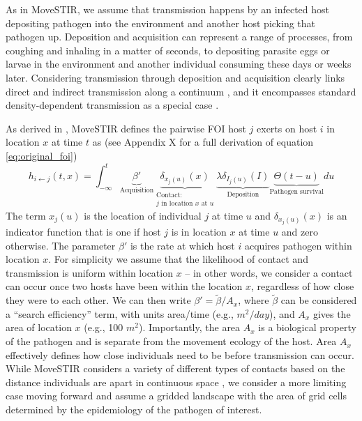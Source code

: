 ﻿\documentclass[11pt]{article}
\begin{document}
As in MoveSTIR, we assume that transmission happens by an infected host depositing pathogen into the environment and another host picking that pathogen up. 
Deposition and acquisition can represent a range of processes, from coughing and inhaling in a matter of seconds, to depositing parasite eggs or larvae in the environment and another individual consuming these days or weeks later. 
Considering transmission through deposition and acquisition clearly links direct and indirect transmission along a continuum \citep{Wilber2022}, and it encompasses standard density-dependent transmission as a special case \citep{Cortez2021}. 

As derived in \cite{Wilber2022}, MoveSTIR defines the pairwise FOI host $j$ exerts on host $i$ in location $x$ at time $t$ as \citep{Wilber2022} (see Appendix X for a full derivation of equation \ref{eq:original_foi})
\begin{equation}
    h_{i \leftarrow j}(t, x) = \int_{-\infty}^{t} \underbrace{\beta'}_{\text{Acquisition}} \underbrace{\delta_{x_j(u)}(x)}_{\substack{\text{Contact:} \\ \text{$j$ in location $x$ at $u$}}}  \underbrace{\lambda \delta_{I_j(u)}(I)}_{\text{Deposition}} \underbrace{\Theta(t - u)}_{\text{Pathogen survival}} du
    \label{eq:original_foi}
\end{equation}
The term $x_j(u)$ is the location of individual $j$ at time $u$ and $\delta_{x_j(u)}(x)$ is an indicator function that is one if host $j$ is in location $x$ at time $u$ and zero otherwise. The parameter $\beta'$ is the rate at which host $i$ acquires pathogen within location $x$. For simplicity we assume that the likelihood of contact and transmission is uniform within location $x$ -- in other words, we consider a contact can occur once two hosts have been within the location $x$, regardless of how close they were to each other. We can then write $\beta'=\tilde{\beta} / A_x$, where $\tilde{\beta}$ can be considered a ``search efficiency'' term, with units area/time (e.g., $m^2 / day$), and $A_x$ gives the area of location $x$ (e.g., 100 $m^2$). %
Importantly, the area $A_x$ is a biological property of the pathogen and is separate from the movement ecology of the host. Area $A_x$ effectively defines how close individuals need to be before transmission can occur. While MoveSTIR considers a variety of different types of contacts based on the distance individuals are apart in continuous space \citep{Wilber2022}, we consider a more limiting case moving forward and assume a gridded landscape with the area of grid cells determined by the epidemiology of the pathogen of interest.  %
\end{document}
